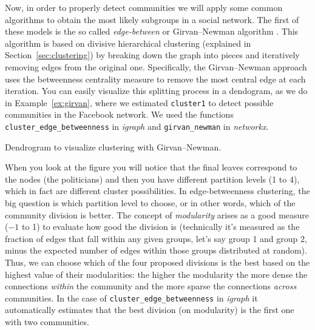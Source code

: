 
Now, in order to properly detect communities we will apply some common algorithms to obtain the most likely subgroups in a social network. The first of these models is the so called \emph{edge-between} or Girvan--Newman algorithm \citep{newman2004finding}. This algorithm is based on divisive hierarchical clustering (explained in Section~\ref{sec:clustering}) by breaking down the graph into pieces and iteratively removing edges from the original one. Specifically,  the Girvan--Newman approach uses the betweenness centrality measure to remove the most central edge at each iteration. You can easily visualize this splitting process in a dendogram, as we do in Example~\ref{ex:girvan}, where we estimated \texttt{cluster1} to detect possible communities in the Facebook network. We used the functions \texttt{cluster\_edge\_betweenness} in \emph{igraph} and \texttt{girvan\_newman} in \emph{networkx}.

\begin{ccsexample}
  \caption{Dendrogram to visualize clustering with Girvan--Newman.}
  \label{ex:girvan}
\end{ccsexample}



When you look at the figure you will notice that the final leaves correspond to the nodes (the politicians) and then you have different partition levels (1 to 4), which in fact are different cluster possibilities. In edge-betweenness clustering, the big question is which partition level to choose, or in other words, which of the community division is better. The concept of \emph{modularity} arises as a good measure ($-1$ to 1) to evaluate how good the division is (technically it's measured as the fraction of edges that fall within any given groups, let's say group 1 and group 2, minus the expected number of edges within those groups distributed at random). Thus, we can choose which of the four proposed divisions is the best based on the highest value of their modularities: the higher the modularity the more dense the connections \emph{within} the community and the more sparse the connections \emph{across} communities. In the case of \texttt{cluster\_edge\_betweenness} in \emph{igraph} it automatically estimates that the best division (on modularity) is the first one with two communities.

